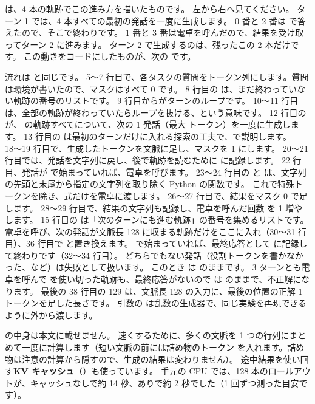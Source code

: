 は、4 本の軌跡でこの進み方を描いたものです。
左から右へ見てください。
ターン 1 では、4 本すべての最初の発話を一度に生成します。
0 番と 2 番は  で答えたので、そこで終わりです。
1 番と 3 番は電卓を呼んだので、結果を受け取ってターン 2 に進みます。
ターン 2 で生成するのは、残ったこの 2 本だけです。
この動きをコードにしたものが、次の  です。


流れは  と同じです。
5〜7 行目で、各タスクの質問をトークン列にします。質問は環境が書いたので、マスクはすべて 0 です。
8 行目の  は、まだ終わっていない軌跡の番号のリストです。
9 行目からがターンのループです。
10〜11 行目は、全部の軌跡が終わっていたらループを抜ける、という意味です。
12 行目の  が、 の軌跡すべてについて、次の 1 発話（最大  トークン）を一度に生成します。
13 行目の  は最初のターンだけに入れる探索の工夫で、で説明します。
18〜19 行目で、生成したトークンを文脈に足し、マスクを 1 にします。
20〜21 行目では、発話を文字列に戻し、後で軌跡を読むために  に記録します。
22 行目、発話が  で始まっていれば、電卓を呼びます。
23〜24 行目の  と  は、文字列の先頭と末尾から指定の文字列を取り除く Python の関数です。
これで特殊トークンを除き、式だけを電卓に渡します。
26〜27 行目で、結果をマスク 0 で足します。
28〜29 行目で、結果の文字列も記録し、電卓を呼んだ回数  を 1 増やします。
15 行目の  は「次のターンにも進む軌跡」の番号を集めるリストです。
電卓を呼び、次の発話が文脈長 128 に収まる軌跡だけをここに入れ（30〜31 行目）、36 行目で  と置き換えます。
 で始まっていれば、最終応答として  に記録して終わりです（32〜34 行目）。
どちらでもない発話（役割トークンを書かなかった、など）は失敗として扱います。
このとき  は  のままです。
3 ターンとも電卓を呼んで  を使い切った軌跡も、最終応答がないので  は  のままで、不正解になります。
最後の 38 行目の 129 は、文脈長 128 の入力に、最後の位置の正解 1 トークンを足した長さです。
引数の  は乱数の生成器で、同じ実験を再現できるように外から渡します。

 の中身は本文に載せません。
速くするために、多くの文脈を 1 つの行列にまとめて一度に計算します（短い文脈の前には詰め物のトークン  を入れます。詰め物は注意の計算から隠すので、生成の結果は変わりません）。
途中結果を使い回す\textbf{KV キャッシュ}（）も使っています。
手元の CPU では、128 本のロールアウトが、キャッシュなしで約 14 秒、ありで約 2 秒でした（1 回ずつ測った目安です）。

